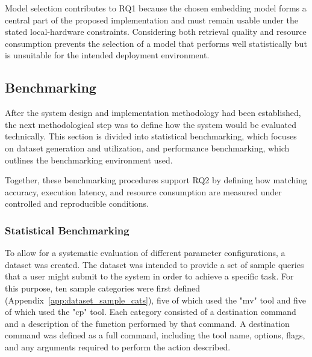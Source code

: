 Model selection contributes to RQ1 because the chosen embedding model forms a central part of the proposed implementation and must remain usable under the stated local-hardware constraints. Considering both retrieval quality and resource consumption prevents the selection of a model that performs well statistically but is unsuitable for the intended deployment environment.

\subsection{Benchmarking}
After the system design and implementation methodology had been established, the next methodological step was to define how the system would be evaluated technically. This section is divided into statistical benchmarking, which focuses on dataset generation and utilization, and performance benchmarking, which outlines the benchmarking environment used.

Together, these benchmarking procedures support RQ2 by defining how matching accuracy, execution latency, and resource consumption are measured under controlled and reproducible conditions.

\subsubsection{Statistical Benchmarking} \label{sec:statistical_benchmarking}
To allow for a systematic evaluation of different parameter configurations, a dataset was created. The dataset was intended to provide a set of sample queries that a user might submit to the system in order to achieve a specific task. For this purpose, ten sample categories were first defined (Appendix~\ref{app:dataset_sample_cats}), five of which used the "mv" tool and five of which used the "cp" tool. Each category consisted of a destination command and a description of the function performed by that command. A destination command was defined as a full command, including the tool name, options, flags, and any arguments required to perform the action described.

